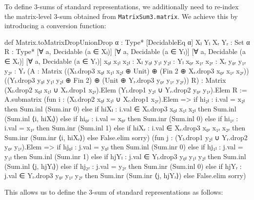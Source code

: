
To define 3-sums of standard representations, we additionally need to re-index the matrix-level 3-sum obtained from \texttt{MatrixSum3.matrix}. We achieve this by introducing a conversion function:
\begin{leancode}
def Matrix.toMatrixDropUnionDrop {α : Type*}
    [DecidableEq α] {Xₗ Yₗ Xᵣ Yᵣ : Set α}
    {R : Type*}
    [∀ a, Decidable (a ∈ Xₗ)]
    [∀ a, Decidable (a ∈ Yₗ)]
    [∀ a, Decidable (a ∈ Xᵣ)]
    [∀ a, Decidable (a ∈ Yᵣ)]
    {x₀ₗ x₁ₗ x₂ₗ : Xₗ} {y₀ₗ y₁ₗ y₂ₗ : Yₗ}
    {x₀ᵣ x₁ᵣ x₂ᵣ : Xᵣ} {y₀ᵣ y₁ᵣ y₂ᵣ : Yᵣ}
    (A : Matrix
      ((Xₗ.drop3 x₀ₗ x₁ₗ x₂ₗ ⊕ Unit)
      ⊕ (Fin 2 ⊕ Xᵣ.drop3 x₀ᵣ x₁ᵣ x₂ᵣ))
      ((Yₗ.drop3 y₀ₗ y₁ₗ y₂ₗ ⊕ Fin 2)
      ⊕ (Unit ⊕ Yᵣ.drop3 y₀ᵣ y₁ᵣ y₂ᵣ))
      R) :
    Matrix
      (Xₗ.drop2 x₀ₗ x₁ₗ ∪ Xᵣ.drop1 x₂ᵣ).Elem
      (Yₗ.drop1 y₂ₗ ∪ Yᵣ.drop2 y₀ᵣ y₁ᵣ).Elem
      R :=
  A.submatrix
    (fun i : (Xₗ.drop2 x₀ₗ x₁ₗ ∪ Xᵣ.drop1 x₂ᵣ).Elem =>
      if hi₂ₗ : i.val = x₂ₗ then
        Sum.inl (Sum.inr 0) else
      if hiXₗ : i.val ∈ Xₗ.drop3 x₀ₗ x₁ₗ x₂ₗ then
        Sum.inl (Sum.inl ⟨i, hiXₗ⟩) else
      if hi₀ᵣ : i.val = x₀ᵣ then
        Sum.inr (Sum.inl 0) else
      if hi₁ᵣ : i.val = x₁ᵣ then
        Sum.inr (Sum.inl 1) else
      if hiXᵣ : i.val ∈ Xᵣ.drop3 x₀ᵣ x₁ᵣ x₂ᵣ then
        Sum.inr (Sum.inr ⟨i, hiXᵣ⟩) else
      False.elim sorry)
    (fun j : (Yₗ.drop1 y₂ₗ ∪ Yᵣ.drop2 y₀ᵣ y₁ᵣ).Elem =>
      if hj₀ₗ : j.val = y₀ₗ then
        Sum.inl (Sum.inr 0) else
      if hj₁ₗ : j.val = y₁ₗ then
        Sum.inl (Sum.inr 1) else
      if hjYₗ : j.val ∈ Yₗ.drop3 y₀ₗ y₁ₗ y₂ₗ then
        Sum.inl (Sum.inl ⟨j, hjYₗ⟩) else
      if hj₂ᵣ : j.val = y₂ᵣ then
        Sum.inr (Sum.inl 0) else
      if hjYᵣ : j.val ∈ Yᵣ.drop3 y₀ᵣ y₁ᵣ y₂ᵣ then
        Sum.inr (Sum.inr ⟨j, hjYᵣ⟩) else
      False.elim sorry)
\end{leancode}
This allows us to define the 3-sum of standard representations as follows:
